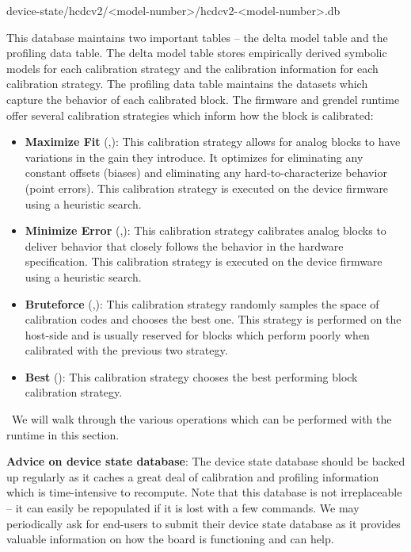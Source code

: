 \begin{snippet}
  device-state/hcdcv2/<model-number>/hcdcv2-<model-number>.db
\end{snippet}

This database maintains two important tables -- the delta model table and the
profiling data table. The delta model table stores empirically derived symbolic
models for each calibration strategy and the calibration information for each
calibration strategy. The profiling data table maintains the datasets which
capture the behavior of each calibrated block. The firmware and grendel runtime
offer several calibration strategies which inform how the block is calibrated:

\begin{itemize}
\item \textbf{Maximize Fit} (,): This calibration strategy allows for analog blocks
  to have variations in the gain they introduce. It optimizes for eliminating
  any constant offsets (biases) and eliminating any hard-to-characterize behavior (point
  errors). This calibration strategy is executed on the device firmware using a
  heuristic search.

\item\textbf{Minimize Error} (,): This calibration strategy calibrates analog
  blocks to deliver behavior that closely follows the behavior in the hardware
  specification. This calibration strategy is executed on the device firmware
  using a heuristic search.

\item\textbf{Bruteforce} (,): This calibration strategy randomly samples the
      space of calibration codes and chooses the best one. This strategy is
      performed on the host-side and is usually reserved for blocks which
      perform poorly when calibrated with the previous two strategy.

\item\textbf{Best} (): This calibration strategy chooses the best performing block
      calibration strategy.
    
\end{itemize}

\noindent~We will walk through the various operations which can be performed
with the \grendel runtime in this section.

\noindent\textbf{Advice on device state database}: The device state database
should be backed up regularly as it caches a great deal of calibration and
profiling information which is time-intensive to recompute. Note that this
database is not irreplaceable -- it can easily be repopulated if it is lost with
a few commands. We may periodically ask for end-users to submit their device state database as it
provides valuable information on how the board is functioning and can help.

